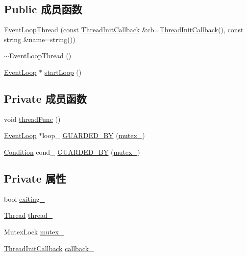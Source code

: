 \subsection*{Public 成员函数}
\begin{DoxyCompactItemize}
\item 
\hyperlink{classmuduo_1_1net_1_1EventLoopThread_a82bb7fe697802eff7fee149f57c648b9}{Event\+Loop\+Thread} (const \hyperlink{classmuduo_1_1net_1_1EventLoopThread_a4665880f4633f1e7d95fd6fef6811717}{Thread\+Init\+Callback} \&cb=\hyperlink{classmuduo_1_1net_1_1EventLoopThread_a4665880f4633f1e7d95fd6fef6811717}{Thread\+Init\+Callback}(), const string \&name=string())
\item 
\hyperlink{classmuduo_1_1net_1_1EventLoopThread_af946ac1087e0c7617b0704ebde55332c}{$\sim$\+Event\+Loop\+Thread} ()
\item 
\hyperlink{classmuduo_1_1net_1_1EventLoop}{Event\+Loop} $\ast$ \hyperlink{classmuduo_1_1net_1_1EventLoopThread_aa1e30e012f873ce27436bff755e3c6ec}{start\+Loop} ()
\end{DoxyCompactItemize}
\subsection*{Private 成员函数}
\begin{DoxyCompactItemize}
\item 
void \hyperlink{classmuduo_1_1net_1_1EventLoopThread_a539feb3c59a20db3b260b312fa7dea34}{thread\+Func} ()
\item 
\hyperlink{classmuduo_1_1net_1_1EventLoop}{Event\+Loop} $\ast$loop\+\_\+ \hyperlink{classmuduo_1_1net_1_1EventLoopThread_a01c1051466742cba8439f828ed4e6dc1}{G\+U\+A\+R\+D\+E\+D\+\_\+\+BY} (\hyperlink{classmuduo_1_1net_1_1EventLoopThread_a6e1bf1809a42f40f1a21178dc6620a6f}{mutex\+\_\+})
\item 
\hyperlink{classmuduo_1_1Condition}{Condition} cond\+\_\+ \hyperlink{classmuduo_1_1net_1_1EventLoopThread_a67954e711a1ee665ffde0186063ce888}{G\+U\+A\+R\+D\+E\+D\+\_\+\+BY} (\hyperlink{classmuduo_1_1net_1_1EventLoopThread_a6e1bf1809a42f40f1a21178dc6620a6f}{mutex\+\_\+})
\end{DoxyCompactItemize}
\subsection*{Private 属性}
\begin{DoxyCompactItemize}
\item 
bool \hyperlink{classmuduo_1_1net_1_1EventLoopThread_a1bead9a84f504b31f1abe7b85e3443cb}{exiting\+\_\+}
\item 
\hyperlink{classmuduo_1_1Thread}{Thread} \hyperlink{classmuduo_1_1net_1_1EventLoopThread_ad920b8087250a686bfa5a9805170974a}{thread\+\_\+}
\item 
Mutex\+Lock \hyperlink{classmuduo_1_1net_1_1EventLoopThread_a6e1bf1809a42f40f1a21178dc6620a6f}{mutex\+\_\+}
\item 
\hyperlink{classmuduo_1_1net_1_1EventLoopThread_a4665880f4633f1e7d95fd6fef6811717}{Thread\+Init\+Callback} \hyperlink{classmuduo_1_1net_1_1EventLoopThread_a0e4cc9f7302bd36be4e4fb604122f6d8}{callback\+\_\+}
\end{DoxyCompactItemize}


